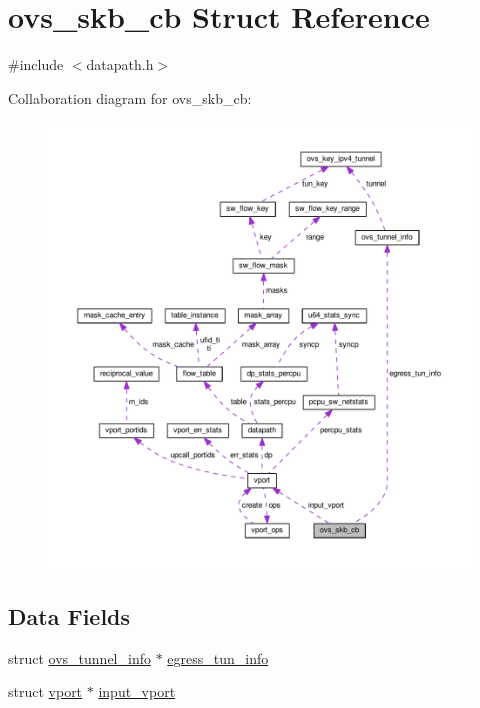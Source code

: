 \hypertarget{structovs__skb__cb}{}\section{ovs\+\_\+skb\+\_\+cb Struct Reference}
\label{structovs__skb__cb}


{\ttfamily \#include $<$datapath.\+h$>$}



Collaboration diagram for ovs\+\_\+skb\+\_\+cb\+:
\nopagebreak
\begin{figure}[H]
\begin{center}
\leavevmode
\includegraphics[width=350pt]{structovs__skb__cb__coll__graph}
\end{center}
\end{figure}
\subsection*{Data Fields}
\begin{DoxyCompactItemize}
\item 
struct \hyperlink{structovs__tunnel__info}{ovs\+\_\+tunnel\+\_\+info} $\ast$ \hyperlink{structovs__skb__cb_a077a089def65a6abde4e8f897591f2dc}{egress\+\_\+tun\+\_\+info}
\item 
struct \hyperlink{structvport}{vport} $\ast$ \hyperlink{structovs__skb__cb_a919a555392390f60eb84d1f46982744c}{input\+\_\+vport}
\end{DoxyCompactItemize}


